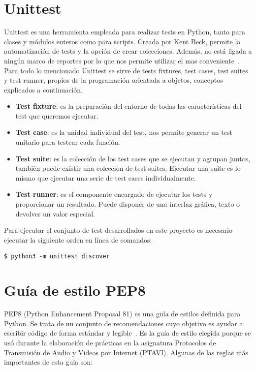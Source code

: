 \documentclass[a4paper, 12pt]{book}
\begin{document}
\section{Unittest} 
\label{sec:unittest}

Unittest es una herramienta empleada para realizar tests en Python, tanto para clases y módulos enteros como para scripts. Creada por Kent Beck, permite la automatización de tests y la opción de crear colecciones. Además, no está ligada a ningún marco de reportes por lo que nos permite utilizar el mas conveniente~\cite{unittestWeb}. Para todo lo mencionado Unittest se sirve de tests fixtures, test cases, test suites y test runner, propios de la programación orientada a objetos, conceptos explicados a continuación. 

\begin{itemize}
	\item \textbf{Test fixture}: es la preparación del entorno de todas las características del test que queremos ejecutar.
	\item \textbf{Test case}: es la unidad individual del test, nos permite generar un test unitario para testear cada función.
	\item \textbf{Test suite}: es la colección de los test cases que se ejecutan y agrupan juntos, también puede existir una coleccion de test suites. Ejecutar una suite es lo mismo que ejecutar una serie de test cases individualmente.
	\item \textbf{Test runner}: es el componente encargado de ejecutar los tests y proporcionar un resultado. Puede disponer de una interfaz gráfica, texto o devolver un valor especial.
\end{itemize}
\newpage 
Para ejecutar el conjunto de test desarrollados en este proyecto es necesario ejecutar la siguiente orden en línea de comandos:

\begin{lstlisting}[style=consola,numbers=none]
$ python3 -m unittest discover
\end{lstlisting}

\section{Guía de estilo PEP8} 
\label{sec:pep8}

PEP8 (Python Enhancement Proposal 81) es una guía de estilos definida para Python. Se trata de un conjunto de recomendaciones cuyo objetivo es ayudar a escribir código de forma estándar y legible~\cite{pep8Web}. Es la guía de estilo elegida porque se usó durante la elaboración de prácticas en la asignatura Protocolos de Transmisión de Audio y Vídeos por Internet (PTAVI). Algunas de las reglas más importantes de esta guía son:
\end{document}

